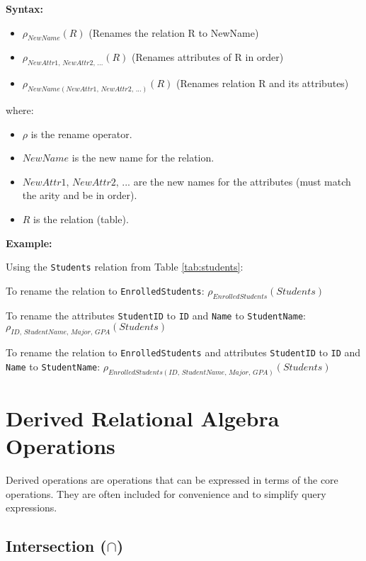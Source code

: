 \documentclass[12pt]{book}
\begin{document}
\textbf{Syntax:}
\begin{itemize}
    \item $\rho_{\mathit{NewName}}(\mathit{R})$ (Renames the relation R to NewName)
    \item $\rho_{\textit{NewAttr1, NewAttr2, ...}}(\mathit{R})$ (Renames attributes of R in order)
    \item $\rho_{\mathit{NewName}(\textit{NewAttr1, NewAttr2, ...})} (\mathit{R})$ (Renames relation R and its attributes)
\end{itemize}

where:
\begin{itemize}
    \item $\rho$ is the rename operator.
    \item $\mathit{NewName}$ is the new name for the relation.
    \item $\textit{NewAttr1, NewAttr2, ...}$ are the new names for the attributes (must match the arity and be in order).
    \item $\mathit{R}$ is the relation (table).
\end{itemize}

\textbf{Example:}

Using the \texttt{Students} relation from Table \ref{tab:students}:

To rename the relation to \texttt{EnrolledStudents}:
$\rho_{\mathit{EnrolledStudents}}(\mathit{Students})$

To rename the attributes \texttt{StudentID} to \texttt{ID} and \texttt{Name} to \texttt{StudentName}:
$\rho_{\textit{ID, StudentName, Major, GPA}}(\mathit{Students})$

To rename the relation to \texttt{EnrolledStudents} and attributes \texttt{StudentID} to \texttt{ID} and \texttt{Name} to \texttt{StudentName}:
$\rho_{\mathit{EnrolledStudents}(\textit{ID, StudentName, Major, GPA})}(\mathit{Students})$

\section{Derived Relational Algebra Operations}

Derived operations are operations that can be expressed in terms of the core operations. They are often included for convenience and to simplify query expressions.

\subsection{Intersection ($\cap$)}
\end{document}
